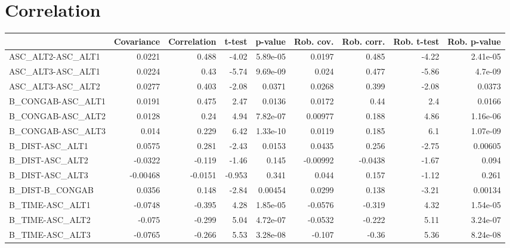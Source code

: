 \section{Correlation}
\begin{tabular}{lrrrrrrrr}
\toprule
{} &  Covariance &  Correlation &  t-test &  p-value &  Rob. cov. &  Rob. corr. &  Rob. t-test &  Rob. p-value \\
\midrule
ASC\_ALT2-ASC\_ALT1      &      0.0221 &        0.488 &   -4.02 & 5.89e-05 &     0.0197 &       0.485 &        -4.22 &      2.41e-05 \\
ASC\_ALT3-ASC\_ALT1      &      0.0224 &         0.43 &   -5.74 & 9.69e-09 &      0.024 &       0.477 &        -5.86 &       4.7e-09 \\
ASC\_ALT3-ASC\_ALT2      &      0.0277 &        0.403 &   -2.08 &   0.0371 &     0.0268 &       0.399 &        -2.08 &        0.0373 \\
B\_CONGAB-ASC\_ALT1      &      0.0191 &        0.475 &    2.47 &   0.0136 &     0.0172 &        0.44 &          2.4 &        0.0166 \\
B\_CONGAB-ASC\_ALT2      &      0.0128 &         0.24 &    4.94 & 7.82e-07 &    0.00977 &       0.188 &         4.86 &      1.16e-06 \\
B\_CONGAB-ASC\_ALT3      &       0.014 &        0.229 &    6.42 & 1.33e-10 &     0.0119 &       0.185 &          6.1 &      1.07e-09 \\
B\_DIST-ASC\_ALT1        &      0.0575 &        0.281 &   -2.43 &   0.0153 &     0.0435 &       0.256 &        -2.75 &       0.00605 \\
B\_DIST-ASC\_ALT2        &     -0.0322 &       -0.119 &   -1.46 &    0.145 &   -0.00992 &     -0.0438 &        -1.67 &         0.094 \\
B\_DIST-ASC\_ALT3        &    -0.00468 &      -0.0151 &  -0.953 &    0.341 &      0.044 &       0.157 &        -1.12 &         0.261 \\
B\_DIST-B\_CONGAB        &      0.0356 &        0.148 &   -2.84 &  0.00454 &     0.0299 &       0.138 &        -3.21 &       0.00134 \\
B\_TIME-ASC\_ALT1        &     -0.0748 &       -0.395 &    4.28 & 1.85e-05 &    -0.0576 &      -0.319 &         4.32 &      1.54e-05 \\
B\_TIME-ASC\_ALT2        &      -0.075 &       -0.299 &    5.04 & 4.72e-07 &    -0.0532 &      -0.222 &         5.11 &      3.24e-07 \\
B\_TIME-ASC\_ALT3        &     -0.0765 &       -0.266 &    5.53 & 3.28e-08 &     -0.107 &       -0.36 &         5.36 &      8.24e-08 \\

\end{tabular}
